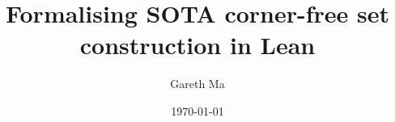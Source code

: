 \documentclass{article}[11px]
\title{Formalising SOTA corner-free set construction in Lean}
\author{Gareth Ma}
\date{\today}
\begin{document}
 \maketitle

\begin{abstract}
  ~\cite{GreenTao12} \lipsum[1]
\end{abstract}

\tableofcontents

\pagebreak


















\clearpage
\printbibliography
\end{document}
